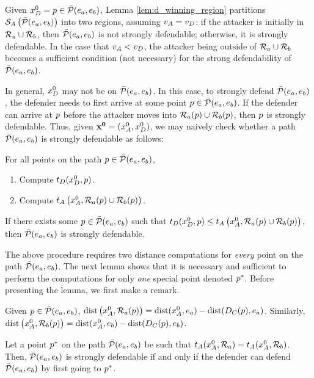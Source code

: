 Given $x_D^0=p\in\bar{\mathcal{P}}(e_a,e_b)$, Lemma \ref{lem:d_winning_region} partitions $\mathcal{S}_A\left(\bar{\mathcal{P}}(e_a,e_b)\right)$ into two regions, assuming $v_A=v_D$: if the attacker is initially in $\mathcal{R}_a \cup \mathcal{R}_b$, then $\bar{\mathcal{P}}(e_a,e_b)$ is not strongly defendable; otherwise, it is strongly defendable. In the case that $v_A<v_D$, the attacker being outside of $\mathcal{R}_a \cup \mathcal{R}_b$ becomes a sufficient condition (not necessary) for the strong defendability of $\bar{\mathcal{P}}(e_a,e_b)$.

In general, $x_D^0$ may not be on $\bar{\mathcal{P}}(e_a,e_b)$. In this case, to strongly defend $\bar{\mathcal{P}}(e_a,e_b)$, the defender needs to first arrive at some point $p\in\bar{\mathcal{P}}(e_a,e_b)$. If the defender can arrive at $p$ before the attacker moves into $\mathcal{R}_a(p)\cup\mathcal{R}_b(p)$, then $p$ is strongly defendable. Thus, given $\mathbf{x^0} = (x_A^0,x_D^0)$, we may naively check whether a path $\bar{\mathcal{P}}(e_a,e_b)$ is strongly defendable as follows:

For all points on the path $p\in\bar{\mathcal{P}}(e_a,e_b)$,
\begin{enumerate}
\item Compute $t_D(x_D^0, p)$.
\item Compute $t_A\left(x_A^0,\mathcal{R}_a(p)\cup\mathcal{R}_b(p)\right)$.
\end{enumerate}
If there exists some $p\in\bar{\mathcal{P}}(e_a,e_b)$ such that $t_D(x_D^0, p)\le t_A\left(x_A^0,\mathcal{R}_a(p)\cup\mathcal{R}_b(p)\right)$, then $\bar{\mathcal{P}}(e_a,e_b)$ is strongly defendable. 

The above procedure requires two distance computations for \textit{every} point on the path $\bar{\mathcal{P}}(e_a,e_b)$. The next lemma shows that it is necessary and sufficient to perform the computations for only \textit{one} special point denoted $p^*$. Before presenting the lemma, we first make a remark.

\begin{rem} \label{rem:time_to_region_a}
Given $p\in\bar{\mathcal{P}}(e_a,e_b)$, $\text{dist}\left(x_A^0,\mathcal{R}_a(p)\right) = \text{dist}(x_A^0,e_a) - \text{dist}(D_C(p),e_a)$. Similarly, $\text{dist}\left(x_A^0,\mathcal{R}_b(p)\right) = \text{dist}(x_A^0,e_b) - \text{dist}(D_C(p),e_b)$.
\end{rem}

\begin{lem} \label{lem:pstar}
Let a point $p^*$ on the path $\bar{\mathcal{P}}(e_a,e_b)$ be such that $t_A(x_A^0,\mathcal{R}_a)=t_A(x_A^0,\mathcal{R}_b)$. Then, $\bar{\mathcal{P}}(e_a,e_b)$ is strongly defendable if and only if the defender can defend $\bar{\mathcal{P}}(e_a,e_b)$ by first going to $p^*$.
\end{lem}

